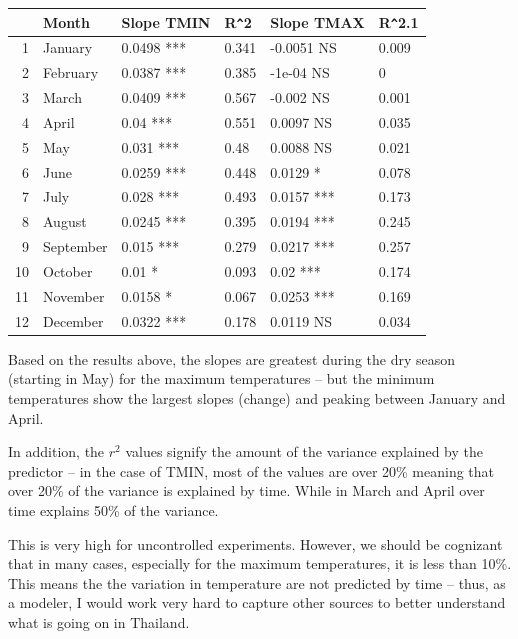 \documentclass{article}\usepackage[]{graphicx}\usepackage[]{color}
\makeatletter
\newenvironment{kframe}{%
 \def\at@end@of@kframe{}%
 \ifinner\ifhmode%
  \def\at@end@of@kframe{\end{minipage}}%
  \begin{minipage}{\columnwidth}%
 \fi\fi%
 \def\FrameCommand##1{\hskip\@totalleftmargin \hskip-\fboxsep
 \colorbox{shadecolor}{##1}\hskip-\fboxsep
     \hskip-\linewidth \hskip-\@totalleftmargin \hskip\columnwidth}%
 \MakeFramed {\advance\hsize-\width
   \@totalleftmargin\z@ \linewidth\hsize
   \@setminipage}}%
 {\par\unskip\endMakeFramed%
 \at@end@of@kframe}
\makeatother
\begin{document}
\begin{enumerate}
\begin{kframe}
\begin{alltt}
\end{alltt}
\end{kframe}%
\begin{table}[ht]
\centering
\begin{tabular}{rlllll}
  \hline
 & Month & Slope TMIN & R\verb|^|2 & Slope TMAX & R\verb|^|2.1 \\ 
  \hline
1 & January & 0.0498 *** & 0.341 & -0.0051 NS & 0.009 \\ 
  2 & February & 0.0387 *** & 0.385 & -1e-04 NS & 0 \\ 
  3 & March & 0.0409 *** & 0.567 & -0.002 NS & 0.001 \\ 
  4 & April & 0.04 *** & 0.551 & 0.0097 NS & 0.035 \\ 
  5 & May & 0.031 *** & 0.48 & 0.0088 NS & 0.021 \\ 
  6 & June & 0.0259 *** & 0.448 & 0.0129 * & 0.078 \\ 
  7 & July & 0.028 *** & 0.493 & 0.0157 *** & 0.173 \\ 
  8 & August & 0.0245 *** & 0.395 & 0.0194 *** & 0.245 \\ 
  9 & September & 0.015 *** & 0.279 & 0.0217 *** & 0.257 \\ 
  10 & October & 0.01 * & 0.093 & 0.02 *** & 0.174 \\ 
  11 & November & 0.0158 * & 0.067 & 0.0253 *** & 0.169 \\ 
  12 & December & 0.0322 *** & 0.178 & 0.0119 NS & 0.034 \\ 
   \hline
\end{tabular}
\end{table}


Based on the results above, the slopes are greatest during the dry season (starting in May) for the maximum temperatures -- but the minimum temperatures show the largest slopes (change) and peaking between January and April.  

In addition, the $r^2$ values signify the amount of the variance explained by the predictor -- in the case of TMIN, most of the values are over 20\% meaning that over 20\% of the variance is explained by time. While in March and April over time explains 50\% of the variance. 

This is very high for uncontrolled experiments. However, we should be cognizant that in many cases, especially for the maximum temperatures, it is less than 10\%. This means the the variation in temperature are not predicted by time -- thus, as a modeler, I would work very hard to capture other sources to better understand what is going on in Thailand. 


\end{enumerate}
\end{document}
